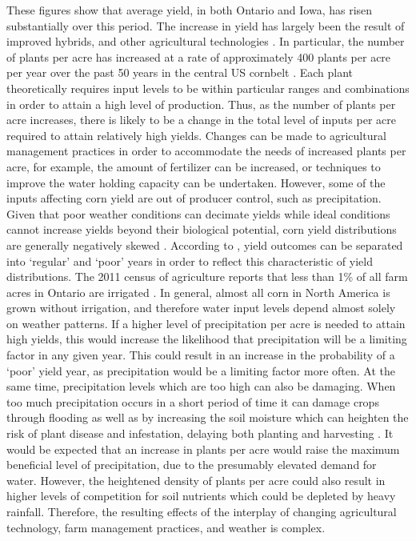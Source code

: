 These figures show that average yield, in both Ontario and Iowa, has risen substantially over this period. The increase in yield has largely been the result of improved hybrids, and other agricultural technologies \citep{edgerton2009increasing}. In particular, the number of plants per acre has increased at a rate of approximately 400 plants per acre per year over the past 50 years in the central US cornbelt \citep{duvick2005contribution}. Each plant theoretically requires input levels to be within particular ranges and combinations in order to attain a high level of production. Thus, as the number of plants per acre increases, there is likely to be a change in the total level of inputs per acre required to attain relatively high yields. Changes can be made to  agricultural management practices in order to accommodate the needs of increased plants per acre, for example, the amount of fertilizer can be increased, or techniques to improve the water holding capacity can be undertaken. However, some of the inputs affecting corn yield are out of producer control, such as precipitation. Given that poor weather conditions can decimate yields while ideal conditions cannot increase yields beyond their biological potential, corn yield distributions are generally negatively skewed \citep{tolhurst2014technological}. According to \cite{tolhurst2014technological}, yield outcomes can be separated into `regular' and `poor' years in order to reflect this characteristic of yield distributions. The 2011 census of agriculture reports that less than 1\% of all farm acres in Ontario are irrigated \citep{CANirrigation, CANcensus}. In general, almost all corn in North America is grown without irrigation, and therefore water input levels depend almost solely on weather patterns. If a higher level of precipitation per acre is needed to attain high yields, this would increase the likelihood that precipitation will be a limiting factor in any given year.  This could result in an increase in the probability of a `poor' yield year, as precipitation would be a limiting factor more often. At the same time, precipitation levels which are too high can also be damaging. When too much precipitation occurs in a short period of time it can damage crops through flooding as well as by increasing the soil moisture which can heighten the risk of plant disease and infestation, delaying both planting and harvesting \cite{rosenzweig2002increased}. It would be expected that an increase in plants per acre would raise the maximum beneficial level of precipitation,  due to the presumably elevated demand for water. However, the heightened density of plants per acre could also result in higher levels of competition for soil nutrients which could be depleted by heavy rainfall. Therefore, the resulting effects of the interplay of changing agricultural technology, farm management practices, and weather is complex.

